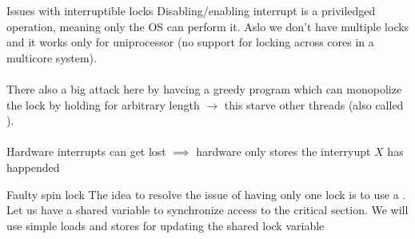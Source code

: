 \documentclass[a4paper]{book}
\begin{document}
\begin{parag}{Issues with interruptible locks}
    Disabling/enabling interrupt is a priviledged operation, meaning only the OS can perform it. Aslo we don't have multiple locks and it works only for uniprocessor (no support for locking across cores in a multicore system).\\
	$ $\\
	There also a big attack here by havcing a greedy program which can monopolize the lock by holding for arbitrary length $\to$ this starve other threads (also called ).\\
	$ $\\
	Hardware interrupts can get lost $\implies$ hardware only stores the interryupt $X$ has happended
\end{parag}


\begin{parag}{Faulty spin lock}
	The idea to resolve the issue of having only one lock is to use a . Let us have a shared variable to synchronize access to the critical section. We will use simple loads and stores for updating the shared lock variable
	
	
\end{parag}
\end{document}
